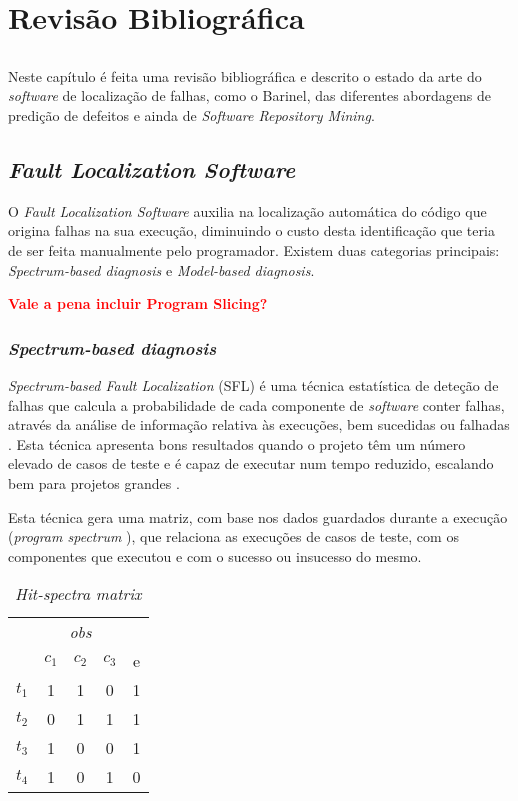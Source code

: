 \chapter{Revisão Bibliográfica} \label{chap:sota}

\section*{}

Neste capítulo é feita uma revisão bibliográfica e descrito o estado da arte do \emph{software} de localização de falhas, como o Barinel, das diferentes abordagens de predição de defeitos e ainda de \emph{Software Repository Mining}.

\section{\emph{Fault Localization Software}}

O \emph{Fault Localization Software} auxilia na localização automática do código que origina falhas na sua execução, diminuindo o custo desta identificação que teria de ser feita manualmente pelo programador. Existem duas categorias principais: \emph{Spectrum-based diagnosis} e \emph{Model-based diagnosis}.

\textbf{\textcolor{red}{Vale a pena incluir Program Slicing?} }

% 
%

\subsection{\emph{Spectrum-based diagnosis}}

\emph{Spectrum-based Fault Localization} (SFL) é uma técnica estatística de deteção de falhas  que calcula a probabilidade de cada componente de \emph{software} conter falhas, através da análise de informação relativa às execuções, bem sucedidas ou falhadas \cite{Abreu2007}. Esta técnica apresenta bons resultados quando o projeto têm um número elevado de casos de teste e é capaz de executar num tempo reduzido, escalando bem para projetos grandes \cite{Mayer2008}.

Esta técnica gera uma matriz, com base nos dados guardados durante a execução (\emph{program spectrum} \cite{Reps1997}), que relaciona as execuções de casos de teste, com os componentes que executou e com o sucesso ou insucesso do mesmo.

\begin{table}[H]
	\centering
	\begin{tabular}{c|ccc|c} 
		& \multicolumn{3}{c|}{\textit{obs}} &  \\
		& $c_1$ & $c_2$ & $c_3$ & e \\ 
	 	\hline
		$t_1$ & 1 & 1 & 0 & 1 \\
		$t_2$ & 0 & 1 & 1 & 1 \\
		$t_3$ & 1 & 0 & 0 & 1 \\
		$t_4$ & 1 & 0 & 1 & 0 \\
	\end{tabular}
	\caption{\emph{Hit-spectra matrix}}
	\label{tab:hit-spectra}
\end{table}

